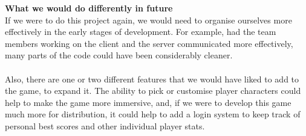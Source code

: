 \documentclass{article}
\begin{document}
\textbf{What we would do differently in future} \\
If we were to do this project again, we would need to organise ourselves more effectively in the early stages of development. For example, had the team members working on the client and the server communicated more effectively, many parts of the code could have been considerably cleaner. \\ \\
Also, there are one or two different features that we would have liked to add to the game, to expand it. The ability to pick or customise player characters could help to make the game more immersive, and, if we were to develop this game much more for distribution, it could help to add a login system to keep track of personal best scores and other individual player stats.
\end{document}
